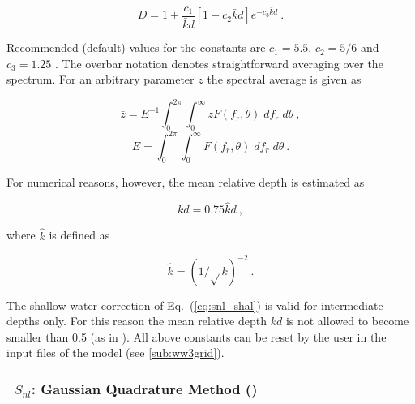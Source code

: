 
\begin{equation}
D = 1 + \frac{c_1}{\bar{k}d} \left [ 1 - c_2 \bar{k} d
\right ] e^{-c_3 \bar{k} d} \: . \label{eq:snl_shal}
\end{equation}

\noindent
Recommended (default) values for the constants are $c_1=5.5$, $c_2=5/6$ and
$c_3=1.25$ \citep{art:Hea85a}. The overbar notation denotes straightforward
averaging over the spectrum. For an arbitrary parameter $z$ the spectral average
is given as


\begin{equation}
\bar{z} = E^{-1} \int_{0}^{2\pi} \int_{0}^{\infty}
z F(f_r,\theta) \; d f_r \; d\theta \: , \label{eq:zbar}
\end{equation}
\begin{equation}
E = \int_{0}^{2\pi} \int_{0}^{\infty}
F(f_r,\theta) \; d f_r \; d\theta \: . \label{eq:etot}
\end{equation}

\noindent
For numerical reasons, however, the mean relative depth is estimated as


\begin{equation}
\bar{k} d = 0.75 \hat{k} d \: , \label{eq:kd_num}
\end{equation}

\noindent
where $\hat{k}$ is defined as

\begin{equation}
\hat{k} = \left ( \overline{1/\sqrt{}k} \right )^{-2} \: .
\label{eq:k_hat}
\end{equation}

\noindent
The shallow water correction of Eq.~(\ref{eq:snl_shal}) is valid for
intermediate depths only. For this reason the mean relative depth
$\bar{k}d$ is not allowed to become smaller than 0.5 (as in \wam). All
above constants can be reset by the user in the input files of the
model (see \para\ref{sub:ww3grid}).

\vsssub
\subsubsection{~$S_{nl}$: Gaussian Quadrature Method  (\dia)} \label{sec:GQM}
\vsssub

